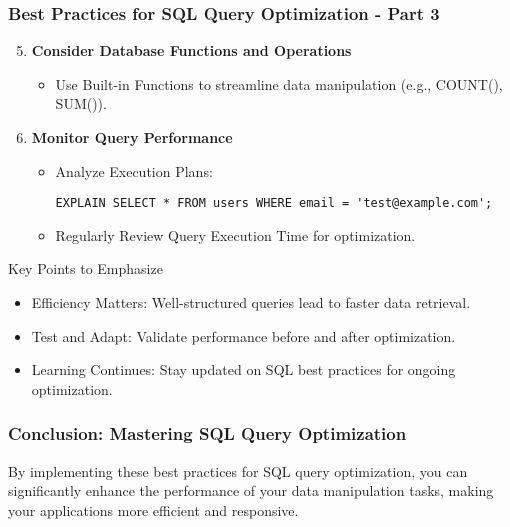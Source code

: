 \documentclass[aspectratio=169]{beamer}
\begin{document}
\begin{frame}[fragile]
    \frametitle{Best Practices for SQL Query Optimization - Part 3}
    \begin{enumerate}
        \setcounter{enumi}{4}
        \item \textbf{Consider Database Functions and Operations}
        \begin{itemize}
            \item Use Built-in Functions to streamline data manipulation (e.g., COUNT(), SUM()).
        \end{itemize}
        
        \item \textbf{Monitor Query Performance}
        \begin{itemize}
            \item Analyze Execution Plans:
            \begin{lstlisting}
EXPLAIN SELECT * FROM users WHERE email = 'test@example.com';
            \end{lstlisting}
            \item Regularly Review Query Execution Time for optimization.
        \end{itemize}
    \end{enumerate}
    
    \begin{block}{Key Points to Emphasize}
        \begin{itemize}
            \item Efficiency Matters: Well-structured queries lead to faster data retrieval.
            \item Test and Adapt: Validate performance before and after optimization.
            \item Learning Continues: Stay updated on SQL best practices for ongoing optimization.
        \end{itemize}
    \end{block}
\end{frame}

\begin{frame}[fragile]
    \frametitle{Conclusion: Mastering SQL Query Optimization}
    By implementing these best practices for SQL query optimization, you can significantly enhance the performance of your data manipulation tasks, making your applications more efficient and responsive.
\end{frame}
\end{document}
